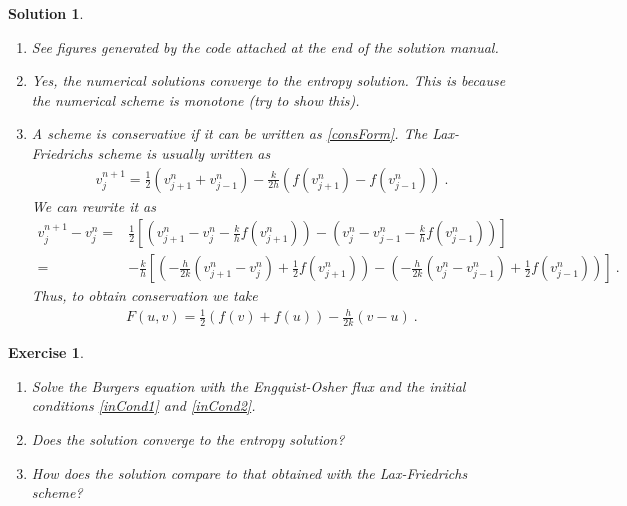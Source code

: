 \documentclass[10pt,letterpaper]{article}
\newcommand{\frb}[1]{ \left(  {#1} \right) }
\theoremstyle{break}
\newtheorem{exercise}{Exercise}
\newtheorem{mysolution}{Solution}
\newenvironment{solution}{\begin{mysolution}}{\end{mysolution}}
\begin{document}
\begin{solution}
	\begin{enumerate}
		\item
		See figures generated by the code
		attached at the end of the solution manual.
		
		\item[(b),(c)]
		\addtocounter{enumii}{2}
		Yes, the numerical solutions converge to the entropy solution. This is because the numerical scheme is monotone (try to show this).
		
		
		
		\item
		A scheme is conservative if it can be written as \eqref{consForm}.
		The Lax-Friedrichs scheme is usually written as 
		\begin{gather}
			v_{j}^{n+1}=\frac{1}{2}\left(v_{j+1}^{n}+v_{j-1}^{n}\right)
				-\frac{k}{2h}\left(f\frb{v_{j+1}^{n}}-f\frb{v_{j-1}^{n}}\right)\ .
		\end{gather}
		We can rewrite it as 
		\begin{align}
			v_{j}^{n+1}-v_{j}^{n}= & \frac{1}{2}\left[\left(v_{j+1}^{n}-v_{j}^{n}-\frac{k}{h}f\frb{v_{j+1}^{n}}\right)
					-\left(v_{j}^{n}-v_{j-1}^{n}-\frac{k}{h}f\frb{v_{j-1}^{n}}\right)\right]\\[0.5em]
				= & -\frac{k}{h}\left[ \left( -\frac{h}{2k}\left(v_{j+1}^{n}-v_{j}^{n}\right)
						+\frac{1}{2}f\frb{v_{j+1}^{n}}\right)
					-\left(-\frac{h}{2k}\left(v_{j}^{n}-v_{j-1}^{n}\right)
						+\frac{1}{2}f\frb{v_{j-1}^{n}}\right)\right]\ .
		\end{align}
		Thus, to obtain conservation we take
		\begin{gather}
			F\frb{u,v}= \frac{1}{2}\left(f(v)+f(u)\right) -\frac{h}{2k}\left(v-u\right)\ .
		\end{gather}
	\end{enumerate}
\end{solution}



















\begin{exercise}
	\begin{enumerate}
		\item
		Solve the Burgers equation with the Engquist-Osher flux and the initial conditions \eqref{inCond1} and \eqref{inCond2}.

		\item
		Does the solution converge to the entropy solution?

		\item
		How does the solution compare to that obtained with the Lax-Friedrichs scheme?

	\end{enumerate}
\end{exercise}
\end{document}
